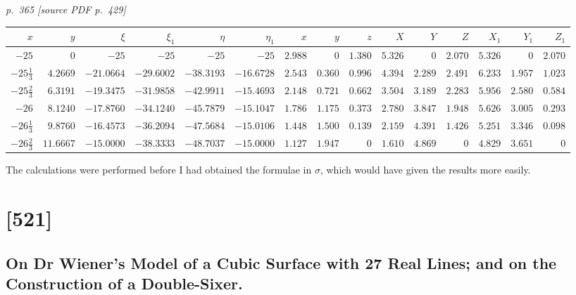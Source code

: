\documentclass[11pt,a4paper]{article}
\newcommand{\pagemarker}[2]{\par\bigskip\noindent\textit{p.~#1 [source PDF p.~#2]}\par\smallskip}
\begin{document}
\clearpage

\bigskip
\pagemarker{365}{429}
\smallskip

\begin{center}
\small
\setlength{\tabcolsep}{2.2pt}
\scriptsize
\begin{tabular}{rrrrrrrrrrrrrrr}
\toprule
$x$ & $y$ & $\xi$ & $\xi_1$ & $\eta$ & $\eta_1$ &
$x$ & $y$ & $z$ & $X$ & $Y$ & $Z$ & $X_1$ & $Y_1$ & $Z_1$\\
\midrule
$-25$ & $0$ & $-25$ & $-25$ & $-25$ & $-25$ &
$2.988$ & $0$ & $1.380$ & $5.326$ & $0$ & $2.070$ & $5.326$ & $0$ & $2.070$\\
$-25\frac{1}{3}$ & $4.2669$ & $-21.0664$ & $-29.6002$ & $-38.3193$ & $-16.6728$ &
$2.543$ & $0.360$ & $0.996$ & $4.394$ & $2.289$ & $2.491$ & $6.233$ & $1.957$ & $1.023$\\
$-25\frac{2}{3}$ & $6.3191$ & $-19.3475$ & $-31.9858$ & $-42.9911$ & $-15.4693$ &
$2.148$ & $0.721$ & $0.662$ & $3.504$ & $3.189$ & $2.283$ & $5.956$ & $2.580$ & $0.584$\\
$-26$ & $8.1240$ & $-17.8760$ & $-34.1240$ & $-45.7879$ & $-15.1047$ &
$1.786$ & $1.175$ & $0.373$ & $2.780$ & $3.847$ & $1.948$ & $5.626$ & $3.005$ & $0.293$\\
$-26\frac{1}{3}$ & $9.8760$ & $-16.4573$ & $-36.2094$ & $-47.5684$ & $-15.0106$ &
$1.448$ & $1.500$ & $0.139$ & $2.159$ & $4.391$ & $1.426$ & $5.251$ & $3.346$ & $0.098$\\
$-26\frac{2}{3}$ & $11.6667$ & $-15.0000$ & $-38.3333$ & $-48.7037$ & $-15.0000$ &
$1.127$ & $1.947$ & $0$ & $1.610$ & $4.869$ & $0$ & $4.829$ & $3.651$ & $0$\\
\bottomrule
\end{tabular}
\end{center}

The calculations were performed before I had obtained the formulae in $\sigma$, which
would have given the results more easily.

\clearpage

\clearpage\section*{[521]}
\subsection*{On Dr Wiener's Model of a Cubic Surface with 27 Real Lines; and on the Construction of a Double-Sixer.}
\end{document}
